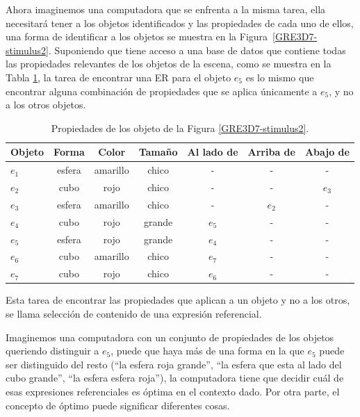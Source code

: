Ahora imaginemos una computadora que se enfrenta a la misma
tarea, ella necesitar\'a tener a los objetos identificados y las propiedades de cada uno de ellos, una forma de identificar a los objetos se muestra en la Figura~\ref{GRE3D7-stimulus2}. Suponiendo que tiene acceso a una base de datos que contiene todas
las propiedades relevantes de los objetos de la escena, como se muestra en la Tabla \ref{tabla-propiedades}, la tarea de encontrar una ER para el objeto $e_5$ es lo mismo que encontrar alguna combinaci\'on de propiedades que se aplica \'unicamente a $e_5$, y no a los otros objetos.


\begin{table}[h!]
\begin{center}
\begin{tabular}{|l|c|c|c|c|c|c|}
\hline
Objeto& 	Forma		&	Color	&	Tama\~no & Al lado de & Arriba de	& Abajo de	\\
\hline
$e_1$ & esfera & amarillo & chico & - & - & -\\
$e_2$ & cubo & rojo & chico & - & - & $e_3$\\
$e_3$ & esfera & amarillo & chico & - & $e_2$ & -\\
$e_4$ & cubo & rojo & grande & $e_5$ & - & -\\
$e_5$ & esfera & rojo & grande & $e_4$ & - & -\\
$e_6$ & cubo & amarillo & chico & $e_7$ & - & -\\
$e_7$ & cubo & rojo & chico & $e_6$ & - & -\\

\hline
\end{tabular}
\caption{Propiedades de los objeto de la Figura \ref{GRE3D7-stimulus2}.}
\vspace*{-.5cm}
\label{tabla-propiedades}
\end{center}
\end{table}


Esta tarea de encontrar las propiedades que aplican a un objeto y no a los otros, se llama selecci\'on de contenido de una expresi\'on referencial.  

Imaginemos una computadora con un conjunto de propiedades de los objetos queriendo distinguir a $e_5$, puede que haya m\'as de una forma en la que $e_5$ puede ser distinguido del resto (``la esfera roja grande'', ``la esfera que esta al lado del cubo grande'', ``la esfera esfera roja''), la computadora tiene que decidir cu\'al de esas expresiones referenciales es \'optima en el contexto dado. Por otra parte, el concepto de \'optimo puede significar diferentes cosas.

